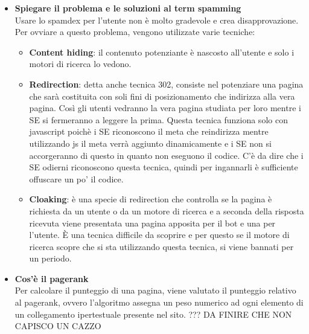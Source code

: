 \documentclass[10pt,                    %
               a4paper,                 %
               twoside,                 %
               openright,               %
               english,                 
               italian,                 
]{article}
\begin{document}
\begin{itemize}
\item \textbf{Spiegare il problema e le soluzioni al term spamming} \\
Usare lo spamdex per l'utente non è molto gradevole e crea disapprovazione.
Per ovviare a questo problema, vengono utilizzate varie tecniche:
\begin{itemize}
\item \textbf{Content hiding}: il contenuto potenziante è nascosto all'utente 
e solo i motori di ricerca lo vedono.
\item \textbf{Redirection}: detta anche tecnica 302, consiste nel potenziare 
una pagina che sarà costituita con soli fini di posizionamento che indirizza
alla vera pagina. Così gli utenti vedranno la vera pagina studiata per loro 
mentre i SE si fermeranno a leggere la prima. Questa tecnica funziona solo 
con javascript poichè i SE riconoscono il meta che reindirizza mentre 
utilizzando js il meta verrà aggiunto dinamicamente e i SE non si 
accorgeranno di questo in quanto non eseguono il codice. C'è da dire che i SE 
odierni riconoscono questa tecnica, quindi per ingannarli è sufficiente 
offuscare un po' il codice.
\item \textbf{Cloaking}: è una specie di redirection che controlla se la 
pagina è richiesta da un utente o da un motore di ricerca e a seconda della
risposta ricevuta viene presentata una pagina apposita per il bot e una per 
l'utente. È una tecnica difficile da scoprire e per questo se il motore di 
ricerca scopre che si sta utilizzando questa tecnica, si viene bannati per 
un periodo.
\end{itemize}

\item \textbf{Cos'è il pagerank} \\
Per calcolare il punteggio di una pagina, viene valutato il punteggio 
relativo al pagerank, ovvero l'algoritmo assegna un peso numerico ad ogni 
elemento di un collegamento ipertestuale presente nel sito. ???
DA FINIRE CHE NON CAPISCO UN CAZZO

\end{itemize}
\end{document}
